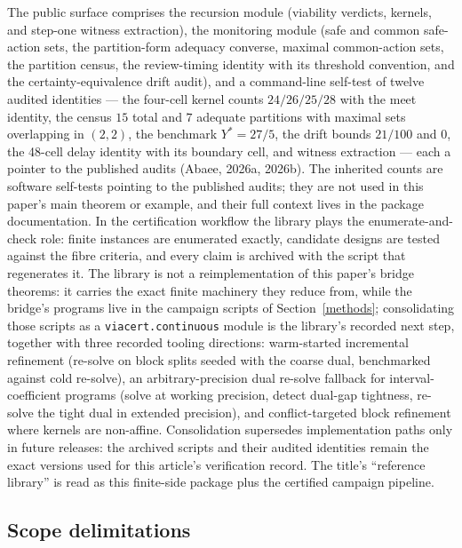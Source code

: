 \documentclass[10pt,twocolumn]{article}
\theoremstyle{plain}
\theoremstyle{definition}
\theoremstyle{remark}
\begin{document}
The public surface comprises the recursion module (viability verdicts,
kernels, and step-one witness extraction), the monitoring module (safe and
common safe-action sets, the partition-form adequacy converse, maximal
common-action sets, the partition census, the review-timing identity with
its threshold convention, and the certainty-equivalence drift audit), and a
command-line self-test of twelve audited identities --- the four-cell kernel
counts \(24/26/25/28\) with the meet identity, the census \(15\) total and
\(7\) adequate partitions with maximal sets overlapping in \((2,2)\), the
benchmark \(Y^{*} = 27/5\), the drift bounds \(21/100\) and \(0\), the
48-cell delay identity with its boundary cell, and witness extraction ---
each a pointer to the published audits (Abaee, 2026a, 2026b). The
inherited counts are software self-tests pointing to the published audits;
they are not used in this paper's main theorem or example, and their full
context lives in the package documentation. In the certification workflow
the library plays the enumerate-and-check role:
finite instances are enumerated exactly, candidate designs are tested
against the fibre criteria, and every claim is archived with the script that
regenerates it. The library is not a reimplementation of this paper's bridge theorems: it carries the exact finite machinery they reduce from, while the bridge's programs live in the campaign scripts of Section~\ref{methods}; consolidating those scripts as a \texttt{viacert.continuous} module is the library's recorded next step, together with three recorded tooling directions: warm-started incremental refinement (re-solve on block splits seeded with the coarse dual, benchmarked against cold re-solve), an arbitrary-precision dual re-solve fallback for interval-coefficient programs (solve at working precision, detect dual-gap tightness, re-solve the tight dual in extended precision), and conflict-targeted block refinement where kernels are non-affine. Consolidation supersedes implementation paths only in future releases:
the archived scripts and their audited identities remain the exact versions
used for this article's verification record. The title's ``reference
library'' is read as this finite-side package plus the certified campaign
pipeline.

\subsection{Scope delimitations}\label{scope}
\end{document}
